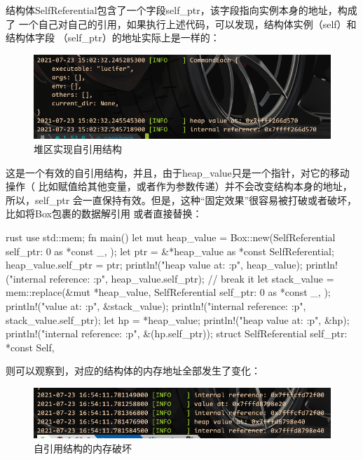 结构体SelfReferential包含了一个字段self\_ptr，该字段指向实例本身的地址，构成了
一个自己对自己的引用，如果执行上述代码，可以发现，结构体实例（self）和结构体字段
（self\_ptr）的地址实际上是一样的：
\begin{figure}[H]
  \centering
  \includegraphics[width=\linewidth]{self_ref_on_heap.png}
  \caption{堆区实现自引用结构}
  \label{fig:self_ref_on_heap}
\end{figure}

这是一个有效的自引用结构，并且，由于heap\_value只是一个指针，对它的移动操作（
比如赋值给其他变量，或者作为参数传递）并不会改变结构本身的地址，所以，self\_ptr
会一直保持有效。但是，这种“固定效果”很容易被打破或者破坏，比如将Box包裹的数据解引用
或者直接替换：
\begin{code-block}{rust}
use std::mem;
fn main() {
    let mut heap_value = Box::new(SelfReferential { self_ptr: 0 as *const _, });
    let ptr = &*heap_value as *const SelfReferential;
    heap_value.self_ptr = ptr;
    println!("heap value at: {:p}", heap_value);
    println!("internal reference: {:p}", heap_value.self_ptr);
    // break it
    let stack_value = mem::replace(&mut *heap_value, SelfReferential {
        self_ptr: 0 as *const _,
    });
    println!("value at: {:p}", &stack_value);
    println!("internal reference: {:p}", stack_value.self_ptr);
    let hp = *heap_value;
    println!("heap value at: {:p}", &hp);
    println!("internal reference: {:p}", &(hp.self_ptr));
}
struct SelfReferential { self_ptr: *const Self, }
\end{code-block}
则可以观察到，对应的结构体的内存地址全部发生了变化：
\begin{figure}[H]
  \centering
  \includegraphics[width=\linewidth]{self_ref_on_heap_break.png}
  \caption{自引用结构的内存破坏}
  \label{fig:self_ref_on_heap_break}
\end{figure}

